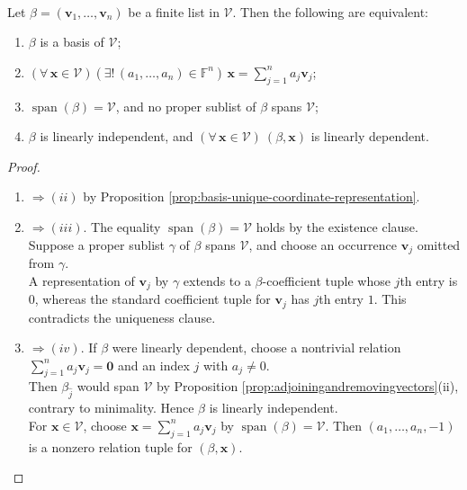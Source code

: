\begin{theorem} \label{thm:basis-equivalent-characterizations} \\
Let $\beta=(\mathbf{v}_1,\ldots,\mathbf{v}_n)$ be a finite list in $\mathcal{V}$. Then the following are equivalent:
\begin{enumerate}[label=(\roman*)]
\setlength{\itemsep}{0pt}
\item $\beta$ is a basis of $\mathcal{V}$;
\item $(\forall\,\mathbf{x}\in\mathcal{V})(\exists!\,(a_1,\ldots,a_n)\in\mathbb{F}^n)\,\mathbf{x}=\sum\limits_{j=1}^{n}a_j\mathbf{v}_j$;
\item $\operatorname{span}(\beta)=\mathcal{V}$, and no proper sublist of $\beta$ spans $\mathcal{V}$;
\item $\beta$ is linearly independent, and $(\forall\,\mathbf{x}\in\mathcal{V})\ (\beta,\mathbf{x})$ is linearly dependent.
\end{enumerate}
\begin{proof}
\begin{enumerate}[label=(\roman*)]
\setlength{\itemsep}{0pt}
\item[$(i)$] $\Rightarrow (ii)$ by Proposition \ref{prop:basis-unique-coordinate-representation}.
\item[$(ii)$] $\Rightarrow (iii)$. The equality $\operatorname{span}(\beta)=\mathcal{V}$ holds by the existence clause.\\
Suppose a proper sublist $\gamma$ of $\beta$ spans $\mathcal{V}$, and choose an occurrence $\mathbf{v}_j$ omitted from $\gamma$.\\
A representation of $\mathbf{v}_j$ by $\gamma$ extends to a $\beta$-coefficient tuple whose $j$th entry is $0$, whereas the standard coefficient tuple for $\mathbf{v}_j$ has $j$th entry $1$. This contradicts the uniqueness clause.
\item[$(iii)$] $\Rightarrow (iv)$. If $\beta$ were linearly dependent, choose a nontrivial relation $\sum\limits_{j=1}^{n}a_j\mathbf{v}_j=\mathbf{0}$ and an index $j$ with $a_j\neq0$.\\
Then $\beta_{\widehat{j}}$ would span $\mathcal{V}$ by Proposition \ref{prop:adjoiningandremovingvectors}(ii), contrary to minimality. Hence $\beta$ is linearly independent.\\
For $\mathbf{x}\in\mathcal{V}$, choose $\mathbf{x}=\sum\limits_{j=1}^{n}a_j\mathbf{v}_j$ by $\operatorname{span}(\beta)=\mathcal{V}$. Then $(a_1,\ldots,a_n,-1)$ is a nonzero relation tuple for $(\beta,\mathbf{x})$.

\end{enumerate}
\end{proof}
\end{theorem}
